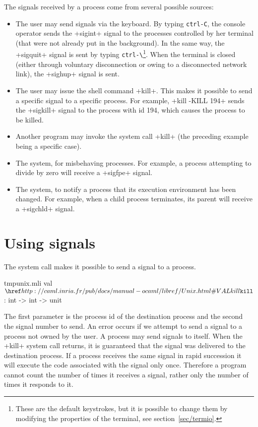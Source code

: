 The signals received by a process come from several possible sources:
%
\begin{itemize}

\item The user may send signals via the keyboard.  By typing \verb'ctrl-C',
  the console operator sends the \ml+sigint+ signal to the processes
  controlled by her terminal (that were not already put in the background).
  In the same way, the \ml+sigquit+ signal is sent by typing \verb'ctrl-\'\footnote{These 
    are the default keystrokes, but it is possible to change them by 
    modifying the properties of the terminal, see section~\ref {sec/termio}.}.  
  When the terminal is closed (either through voluntary disconnection or owing to a disconnected network link), the \ml+sighup+ signal is sent.

\item The user may issue the shell command \ml+kill+.  This makes it possible 
  to send a specific signal to a specific process.  For example, 
  \ml+kill -KILL 194+ sends the \ml+sigkill+ signal to the process with id 194, which 
  causes the process to be killed.

\item Another program may invoke the system call 
  \ml+kill+ (the preceding example being a specific case).

\item The system, for misbehaving processes.  For example, a process 
  attempting to divide by zero will receive a \ml+sigfpe+ signal.

\item The system, to notify a process that its execution environment has 
  been changed.  For example, when a child process terminates, its parent 
  will receive a \ml+sigchld+ signal.

\end{itemize}


\section{\label{sec/usingsignals}Using signals}

The system call  makes it possible to send a
signal to a process.
%
\begin{listingcodefile}{tmpunix.mli}
val $\libvalue{Unix}{kill}$ : int -> int -> unit
\end{listingcodefile}
% 
The first parameter is the process id of the destination process and
the second the signal number to send. An error occurs if we attempt to
send a signal to a process not owned by the user.  A process may send
signals to itself.  When the \ml+kill+ system call returns, it is
guaranteed that the signal was delivered to the destination
process. If a process receives the same signal in rapid succession it
will execute the code associated with the signal only once.  Therefore
a program cannot count the number of times it receives a signal,
rather only the number of times it responds to it.

